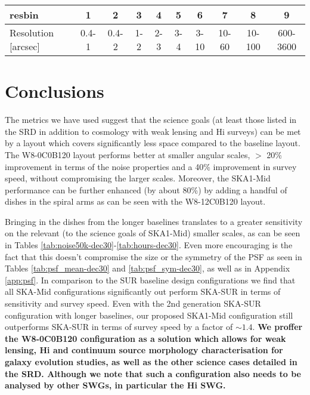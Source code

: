 \documentclass[sfheadings,a4paper,times,9pt,floats,floatfix]{article}
\begin{document}


\begin{landscape}
 \begin{table}[H]
  \begin{tabular}{|lccccccccc|}\hline
  resbin & 1 & 2 & 3 & 4 & 5 & 6 & 7 & 8 & 9 \\\hline
  Resolution [arcsec] & 0.4-1 & 0.4-2 & 1-2 & 2-3 & 3-4 & 3-10 & 10-60 & 10-100 & 600-3600 \\\hline
  \end{tabular}
 \end{table}
 

\end{landscape}
\newpage
\section{Conclusions}\label{sec:conclusion}
The metrics we have used suggest that the science goals (at least those listed in the SRD in addition to cosmology with weak
lensing and H{\sc i} surveys) can be met by a layout which covers significantly less space compared to the baseline layout. The
W8-0C0B120 layout performs better at smaller angular scales, $>$ 20\% improvement in terms of the noise properties and a
40\% improvement in survey speed, without compromising the larger scales. Moreover, the SKA1-Mid performance can be
further enhanced (by about 80\%) by adding a handful of dishes in the spiral arms as can be seen with the W8-12C0B120
layout.

Bringing in the dishes from the longer baselines translates to a greater sensitivity on the relevant (to the
science goals of SKA1-Mid) smaller scales, as can be seen in Tables \ref{tab:noise50k-dec30}-\ref{tab:hours-dec30}. Even
more encouraging is the fact that this doesn't compromise the size or the symmetry of the PSF as seen in Tables
\ref{tab:psf_mean-dec30} and \ref{tab:psf_sym-dec30}, as well as in Appendix \ref{app:psf}.  In comparison to the
SUR baseline design configurations we find that all SKA-Mid configurations significantly out perform SKA-SUR in
terms of sensitivity and survey speed. Even with the 2nd generation SKA-SUR configuration with longer baselines, our
proposed SKA1-Mid configuration still outperforms SKA-SUR in terms of survey speed by a factor of
$\sim 1.4$. {\bf We proffer the W8-0C0B120 configuration as a solution which allows for weak lensing, H{\sc i}
and continuum source morphology characterisation for galaxy evolution studies, as well as the other science cases detailed in the
SRD. Although we note that such a configuration also needs to be analysed by other SWGs, in particular the H{\sc i}
SWG.}
\end{document}
